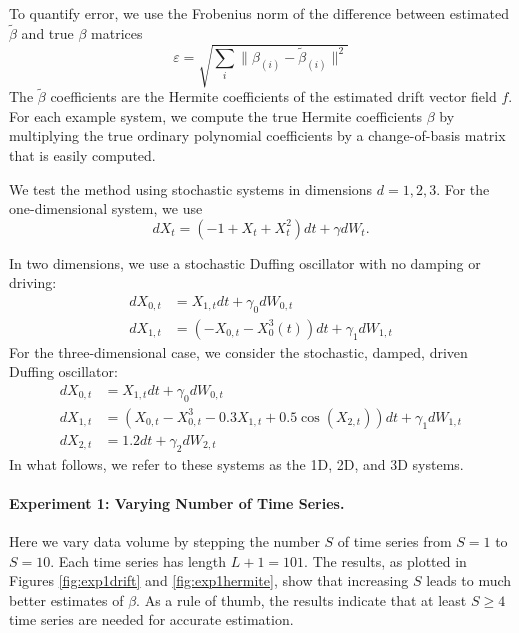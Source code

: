 \documentclass{article}
\begin{document}
To quantify error, we use the Frobenius norm of the difference between estimated $\widetilde{\beta}$ and true $\beta$ matrices
\begin{equation}
\label{eqn:frob}
\varepsilon = \sqrt{\sum_i \| \beta_{(i)} - \widetilde{\beta}_{(i)} \|^2 }
\end{equation}
The $\widetilde{\beta}$ coefficients are the Hermite coefficients of the estimated drift vector field $f$.  For each example system, we compute the true Hermite coefficients $\beta$ by multiplying the true ordinary polynomial coefficients by a change-of-basis matrix that is easily computed.

We test the method using stochastic systems in dimensions $d= 1, 2, 3$.
For the one-dimensional system, we use
\begin{equation*}
dX_t = (-1 + X_t + X_t^2 ) dt + \gamma dW_t.
\end{equation*}

In two dimensions, we use a stochastic Duffing oscillator with no damping or driving:
\begin{align*}
dX_{0,t} &= X_{1,t} dt + \gamma_0 dW_{0,t} \\
dX_{1,t} &= (-X_{0,t} - X^3_0(t)) dt + \gamma_1 dW_{1,t}
\end{align*}
For the three-dimensional case, we consider the stochastic, damped, driven Duffing oscillator:
\begin{align*}
dX_{0,t} & = X_{1,t} dt + \gamma_0 dW_{0,t} \\
dX_{1,t} & = (X_{0,t} - X_{0,t}^3 - 0.3 X_{1,t} + 0.5 \cos (X_{2,t})) dt + \gamma_1 dW_{1,t} \\
dX_{2,t} & = 1.2 dt + \gamma_2 dW_{2,t}
\end{align*}
In what follows, we refer to these systems as the 1D, 2D, and 3D systems.

\paragraph{Experiment 1: Varying Number of Time Series.} Here we vary data volume by stepping the number $S$ of time series from $S=1$ to $S=10$.  Each time series has length $L+1 = 101$.  The results, as plotted in Figures \ref{fig:exp1drift} and \ref{fig:exp1hermite}, show that increasing $S$ leads to much better estimates of $\beta$.  As a rule of thumb, the results indicate that at least $S \geq 4$ time series are needed for accurate estimation.
\end{document}
